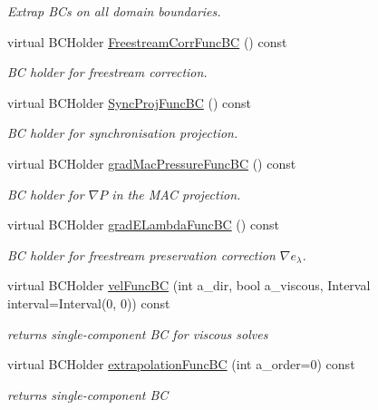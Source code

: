 \begin{DoxyCompactItemize}
\begin{DoxyCompactList}\small\item\em Extrap B\-Cs on all domain boundaries. \end{DoxyCompactList}\item 
virtual B\-C\-Holder \hyperlink{class_phys_b_c_util_abee97d7d7bf3037aca0e1792a81a558d}{Freestream\-Corr\-Func\-B\-C} () const 
\begin{DoxyCompactList}\small\item\em B\-C holder for freestream correction. \end{DoxyCompactList}\item 
virtual B\-C\-Holder \hyperlink{class_phys_b_c_util_ab7b16d2dba8d3952a9a8321ecac5cb97}{Sync\-Proj\-Func\-B\-C} () const 
\begin{DoxyCompactList}\small\item\em B\-C holder for synchronisation projection. \end{DoxyCompactList}\item 
virtual B\-C\-Holder \hyperlink{class_phys_b_c_util_a19088e434b5c1510377761745e789d5f}{grad\-Mac\-Pressure\-Func\-B\-C} () const 
\begin{DoxyCompactList}\small\item\em B\-C holder for $ \nabla P $ in the M\-A\-C projection. \end{DoxyCompactList}\item 
virtual B\-C\-Holder \hyperlink{class_phys_b_c_util_a61e8e687697e7164f3e1a732a52fcbd5}{grad\-E\-Lambda\-Func\-B\-C} () const 
\begin{DoxyCompactList}\small\item\em B\-C holder for freestream preservation correction $ \nabla e_\lambda $. \end{DoxyCompactList}\item 
virtual B\-C\-Holder \hyperlink{class_phys_b_c_util_a91c00ce227d128cdd5cd996ad6142bec}{vel\-Func\-B\-C} (int a\-\_\-dir, bool a\-\_\-viscous, Interval interval=Interval(0, 0)) const 
\begin{DoxyCompactList}\small\item\em returns single-\/component B\-C for viscous solves \end{DoxyCompactList}\item 
virtual B\-C\-Holder \hyperlink{class_phys_b_c_util_a096c38e7c08e42f095456519d34bba4e}{extrapolation\-Func\-B\-C} (int a\-\_\-order=0) const 
\begin{DoxyCompactList}\small\item\em returns single-\/component B\-C \end{DoxyCompactList}\item 

\end{DoxyCompactItemize}
